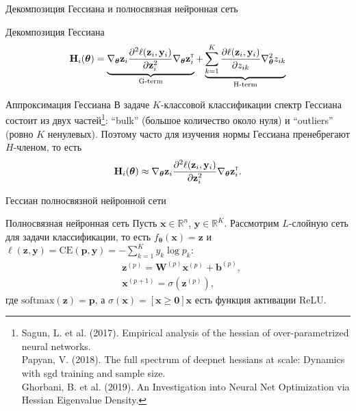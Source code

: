 \documentclass[aspectratio=169]{beamer}
\begin{document}
\begin{frame}{Декомпозиция Гессиана и полносвязная нейронная сеть}
    \begin{block}{Декомпозиция Гессиана}
        \vspace{-0.5em}
        \[
            \mathbf{H}_{i}(\boldsymbol{\theta}) = \underbrace{\nabla_{\boldsymbol{\theta}} \mathbf{z}_i \dfrac{\partial^2 \ell(\mathbf{z}_i, \mathbf{y}_i)}{\partial \mathbf{z}_{i}^2} \nabla_{\boldsymbol{\theta}} \mathbf{z}_i^{\text{\tiny\sffamily\upshape\mdseries T}} }_{\text{G-term}} + \underbrace{\sum\limits_{k=1}^{K} \dfrac{\partial \ell(\mathbf{z}_i, \mathbf{y}_i)}{\partial z_{ik}} \nabla^2_{\boldsymbol{\theta}} z_{ik}}_{\text{H-term}}
        \]
    \end{block}
    \vspace{-2em}
    \begin{block}{Аппроксимация Гессиана}
        В задаче $K$-классовой классификации спектр Гессиана состоит из двух частей\footnote{\scriptsize{Sagun, L. et al. (2017). Empirical analysis of the hessian of over-parametrized neural networks.\\Papyan, V. (2018). The full spectrum of deepnet hessians at scale: Dynamics with sgd training and sample size.\\Ghorbani, B. et al. (2019). An Investigation into Neural Net Optimization via Hessian Eigenvalue Density.}}: ``bulk'' (большое количество около нуля) и ``outliers'' (ровно $K$ ненулевых). Поэтому часто для изучения нормы Гессиана пренебрегают $H$-членом, то есть
        \[ \mathbf{H}_{i}(\boldsymbol{\theta}) \approx \nabla_{\boldsymbol{\theta}} \mathbf{z}_i \dfrac{\partial^2 \ell(\mathbf{z}_i, \mathbf{y}_i)}{\partial \mathbf{z}_{i}^2} \nabla_{\boldsymbol{\theta}} \mathbf{z}_i^{\text{\tiny\sffamily\upshape\mdseries T}}. \]
    \end{block}
\end{frame}

\begin{frame}{Гессиан полносвязной нейронной сети}
    \begin{block}{Полносвязная нейронная сеть}
        Пусть $\mathbf{x} \in \mathbb{R}^{n}$, $\mathbf{y} \in \mathbb{R}^K$. Рассмотрим $L$-слойную сеть для задачи классификации, то есть $f_{\boldsymbol{\theta}}(\mathbf{x}) = \mathbf{z}$ и $\ell(\mathbf{z}, \mathbf{y}) = \mathrm{CE}(\mathbf{p}, \mathbf{y}) = - \sum_{k=1}^{K} y_k \log p_k$:
        \begin{align*}
            &\mathbf{z}^{(p)} = \mathbf{W}^{(p)} \mathbf{x}^{(p)} + \mathbf{b}^{(p)}, \\
            &\mathbf{x}^{(p+1)} = \sigma(\mathbf{z}^{(p)}),
        \end{align*}
        где $\mathrm{softmax}{(\mathbf{z})} = \mathbf{p}$, а $\sigma(\mathbf{x}) = \left[ \mathbf{x} \geqslant \mathbf{0} \right] \mathbf{x}$ есть функция активации ReLU. 

        
    \end{block}
\end{frame}
\end{document}
